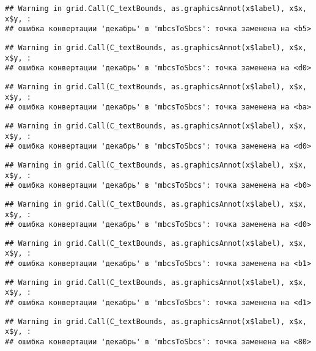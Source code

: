 \documentclass[
]{article}
\begin{document}
\begin{verbatim}
## Warning in grid.Call(C_textBounds, as.graphicsAnnot(x$label), x$x, x$y, :
## ошибка конвертации 'декабрь' в 'mbcsToSbcs': точка заменена на <b5>
\end{verbatim}

\begin{verbatim}
## Warning in grid.Call(C_textBounds, as.graphicsAnnot(x$label), x$x, x$y, :
## ошибка конвертации 'декабрь' в 'mbcsToSbcs': точка заменена на <d0>
\end{verbatim}

\begin{verbatim}
## Warning in grid.Call(C_textBounds, as.graphicsAnnot(x$label), x$x, x$y, :
## ошибка конвертации 'декабрь' в 'mbcsToSbcs': точка заменена на <ba>
\end{verbatim}

\begin{verbatim}
## Warning in grid.Call(C_textBounds, as.graphicsAnnot(x$label), x$x, x$y, :
## ошибка конвертации 'декабрь' в 'mbcsToSbcs': точка заменена на <d0>
\end{verbatim}

\begin{verbatim}
## Warning in grid.Call(C_textBounds, as.graphicsAnnot(x$label), x$x, x$y, :
## ошибка конвертации 'декабрь' в 'mbcsToSbcs': точка заменена на <b0>
\end{verbatim}

\begin{verbatim}
## Warning in grid.Call(C_textBounds, as.graphicsAnnot(x$label), x$x, x$y, :
## ошибка конвертации 'декабрь' в 'mbcsToSbcs': точка заменена на <d0>
\end{verbatim}

\begin{verbatim}
## Warning in grid.Call(C_textBounds, as.graphicsAnnot(x$label), x$x, x$y, :
## ошибка конвертации 'декабрь' в 'mbcsToSbcs': точка заменена на <b1>
\end{verbatim}

\begin{verbatim}
## Warning in grid.Call(C_textBounds, as.graphicsAnnot(x$label), x$x, x$y, :
## ошибка конвертации 'декабрь' в 'mbcsToSbcs': точка заменена на <d1>
\end{verbatim}

\begin{verbatim}
## Warning in grid.Call(C_textBounds, as.graphicsAnnot(x$label), x$x, x$y, :
## ошибка конвертации 'декабрь' в 'mbcsToSbcs': точка заменена на <80>
\end{verbatim}
\end{document}

